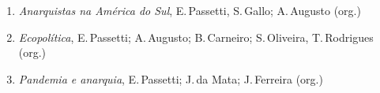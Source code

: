 \begin{enumerate}
\setlength\parskip{4.2pt}
\setlength\itemsep{-1.4mm}
\item \textit{Anarquistas na América do Sul}, E.\,Passetti, S.\,Gallo; A.\,Augusto  (org.)
\item \textit{Ecopolítica}, E.\,Passetti; A.\,Augusto; B.\,Carneiro; S.\,Oliveira, T.\,Rodrigues  (org.)
\item \textit{Pandemia e anarquia}, E.\,Passetti; J.\,da Mata; J.\,Ferreira  (org.)
\end{enumerate}





\endgroup %
\nopagecolor
\color{black}